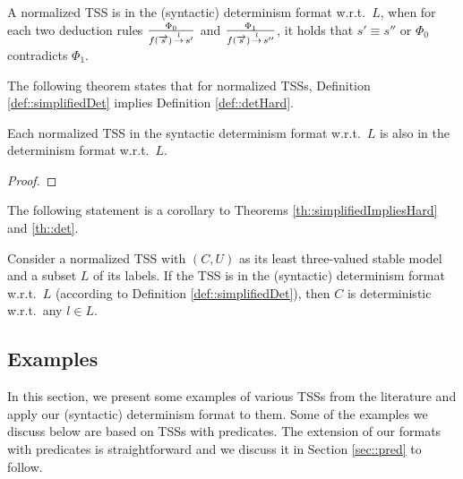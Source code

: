 \begin{definition}
A normalized TSS is in the (syntactic) determinism format w.r.t.\ $L$, when
    for each two deduction rules $\frac{\Phi_0}{f(\overrightarrow{s}) \,{\stackrel{{l}}{\rightarrow}}\, s'}$ and $\frac{\Phi_1}{f(\overrightarrow{s})  \,{\stackrel{{l}}{\rightarrow}}\, s''}$, it holds that $s' \equiv s''$ or $\Phi_0$ contradicts $\Phi_1$.
\end{definition}

The following theorem states that for normalized TSSs, Definition \ref{def::simplifiedDet} implies Definition \ref{def::detHard}.


\begin{theorem}\label{th::simplifiedImpliesHard}
Each normalized TSS in the syntactic determinism format w.r.t.\ $L$ is also in the determinism format w.r.t.\ $L$.
\end{theorem}
\begin{proof}

\end{proof}

The following statement is a corollary to Theorems \ref{th::simplifiedImpliesHard} and \ref{th::det}.

\begin{corollary}
Consider a normalized TSS with $(C, U)$ as its least three-valued stable model and a subset $L$ of its labels. If the TSS is in the (syntactic) determinism format w.r.t.\ $L$ (according to Definition \ref{def::simplifiedDet}), then $C$ is deterministic w.r.t.\ any $l\in L$.
\end{corollary}


\subsection{Examples\label{sec::detExamples}}
In this section, we present some examples of various TSSs from the literature and apply our (syntactic) determinism format to them.
Some of the examples we discuss below are based on TSSs with predicates. The extension of our formats with predicates is
straightforward and we discuss it in Section \ref{sec::pred} to follow.


